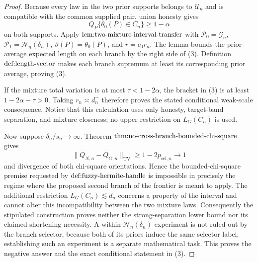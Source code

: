 \documentclass{article}
\begin{document}
\begin{proof}
Because every law in the two prior supports belongs to \(\mathcal U_n\) and is compatible with the common supplied pair, union honesty gives
\[
 Q_P\{\theta_0(P)\in C_n\}\ge1-\alpha
\]
on both supports.  Apply \(\textup{lem:two-mixture-interval-transfer}\) with \(\mathcal P_0=\mathcal G_n\), \(\mathcal P_1=\mathcal N_n(\delta_n)\), \(\vartheta(P)=\theta_0(P)\), and \(r=c_0r_n\).  The lemma bounds the prior-average expected length on each branch by the right side of (3).  Definition \(\textup{def:length-vector}\) makes each branch supremum at least its corresponding prior average, proving (3).

If the mixture total variation is at most \(\tau<1-2\alpha\), the bracket in (3) is at least \(1-2\alpha-\tau>0\).  Taking \(r_n\asymp d_n^-\) therefore proves the stated conditional weak-scale consequence.  Notice that this calculation uses only honesty, target-band separation, and mixture closeness; no upper restriction on \(L_G(C_n)\) is used.

Now suppose \(\delta_n/s_n\to\infty\).  Theorem \(\textup{thm:no-cross-branch-bounded-chi-square}\) gives
\[
 \|\overline Q_{N,n}-\overline Q_{G,n}\|_{\mathrm{TV}}
 \ge1-2p_{\mathrm{sel},n}\longrightarrow1
\]
and divergence of both chi-square orientations.  Hence the bounded-chi-square premise requested by \(\textup{def:fuzzy-hermite-handle}\) is impossible in precisely the regime where the proposed second branch of the frontier is meant to apply.  The additional restriction \(L_G(C_n)\lesssim d_n\) concerns a property of the interval and cannot alter this incompatibility between the two mixture laws.  Consequently the stipulated construction proves neither the strong-separation lower bound nor its claimed shortening necessity.  A within-\(\mathcal N_n(\delta_n)\) experiment is not ruled out by the branch selector, because both of its priors induce the same selector label; establishing such an experiment is a separate mathematical task.  This proves the negative answer and the exact conditional statement in (3).
\end{proof}
\end{document}
